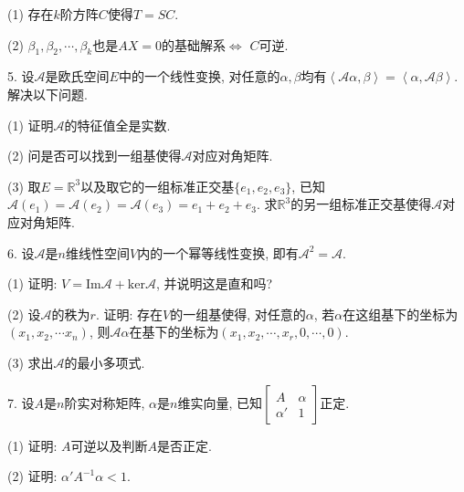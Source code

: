 \documentclass[12pt, a4paper, twoside]{ctexart}%
\begin{document}
{	\hspace{1.2em}(1) 存在$k$阶方阵$C$使得$T=SC$. \par
	\hspace{1.2em}(2) $\beta_1,\beta_2,\cdots,\beta_k$也是$AX=0$的基础解系$\iff$ $C$可逆.\par
	5. 设$\mathscr{A}$是欧氏空间$E$中的一个线性变换, 对任意的$\alpha,\beta$均有$\left<\mathscr{A}\alpha,\beta\right>=\left<\alpha,\mathscr{A}\beta\right>$. 解决以下问题.\par
	\hspace{1.2em}(1) 证明$\mathscr{A}$的特征值全是实数.\par
	\hspace{1.2em}(2) 问是否可以找到一组基使得$\mathscr{A}$对应对角矩阵.\par
	\hspace{1.2em}(3) 取$E=\mathbb{R}^3$以及取它的一组标准正交基$\{e_1,e_2,e_3\}$, 已知$\mathscr{A}(e_1)=\mathscr{A}(e_2)=\mathscr{A}(e_3)=e_1+e_2+e_3$. 求$\mathbb{R}^3$的另一组标准正交基使得$\mathscr{A}$对应对角矩阵.\par
	6. 设$\mathscr{A}$是$n$维线性空间$V$内的一个幂等线性变换, 即有$\mathscr{A}^2=\mathscr{A}$. \par
	\hspace{1.2em}(1) 证明: $V=\mathrm{Im}\mathscr{A}+\mathrm{ker}\mathscr{A}$, 并说明这是直和吗?\par
	\hspace{1.2em}(2) 设$\mathscr{A}$的秩为$r$. 证明: 存在$V$的一组基使得, 对任意的$\alpha$, 若$\alpha$在这组基下的坐标为$\left(x_1,x_2,\cdots x_n\right)$, 则$\mathscr{A}\alpha$在基下的坐标为$\left(x_1, x_2,\cdots, x_r,0,\cdots,0\right)$.\par 
	\hspace{1.2em}(3) 求出$\mathscr{A}$的最小多项式. \par
	7. 设$A$是$n$阶实对称矩阵, $\alpha$是$n$维实向量, 已知$\begin{bmatrix}
		A&\alpha\\
		\alpha'&1
	\end{bmatrix}$正定.\par
	\hspace{1.2em}(1) 证明: $A$可逆以及判断$A$是否正定.\par
	\hspace{1.2em}(2) 证明: $\alpha'A^{-1}\alpha<1$.\par 
	
	\clearpage
	}
\end{document}
